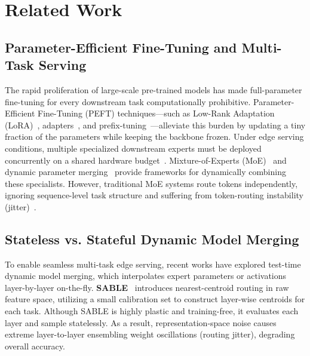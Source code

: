 \section{Related Work}
\label{sec:related}

\subsection{Parameter-Efficient Fine-Tuning and Multi-Task Serving}
The rapid proliferation of large-scale pre-trained models has made full-parameter fine-tuning for every downstream task computationally prohibitive. Parameter-Efficient Fine-Tuning (PEFT) techniques—such as Low-Rank Adaptation (LoRA)~\cite{hu2021lora}, adapters~\cite{houlsby2019parameter}, and prefix-tuning~\cite{li2021prefix}—alleviate this burden by updating a tiny fraction of the parameters while keeping the backbone frozen. Under edge serving conditions, multiple specialized downstream experts must be deployed concurrently on a shared hardware budget~\cite{chen2023}. Mixture-of-Experts (MoE)~\cite{shazeer2017outrageously, fedus2021switch} and dynamic parameter merging~\cite{wortsman2022robust} provide frameworks for dynamically combining these specialists. However, traditional MoE systems route tokens independently, ignoring sequence-level task structure and suffering from token-routing instability (jitter)~\cite{malkin2023}.

\subsection{Stateless vs. Stateful Dynamic Model Merging}
To enable seamless multi-task edge serving, recent works have explored test-time dynamic model merging, which interpolates expert parameters or activations layer-by-layer on-the-fly.
\textbf{SABLE}~\cite{sable2025} introduces nearest-centroid routing in raw feature space, utilizing a small calibration set to construct layer-wise centroids for each task. Although SABLE is highly plastic and training-free, it evaluates each layer and sample statelessly. As a result, representation-space noise causes extreme layer-to-layer ensembling weight oscillations (routing jitter), degrading overall accuracy.

